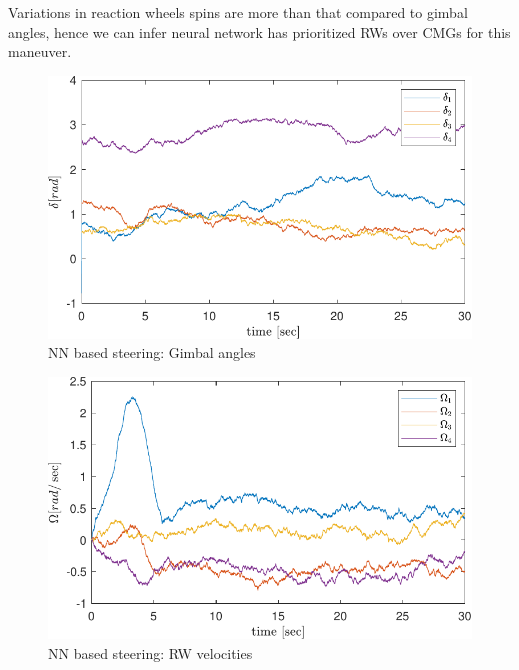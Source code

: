 \noindent Variations in reaction wheels spins are more than that compared to gimbal angles, hence we can infer neural network has prioritized RWs over CMGs for this maneuver.
\begin{figure}[H]
    \centering
    \includegraphics[width=\textwidth]{figures/plots/RL/nn_delta.pdf}
    \caption{NN based steering: Gimbal angles}
    \label{fig:nn__delta}
\end{figure}
\begin{figure}[H]
    \centering
    \includegraphics[width=\textwidth]{figures/plots/RL/nn_Omega.pdf}
    \caption{NN based steering: RW velocities}
    \label{fig:nn__Omega}
\end{figure}

